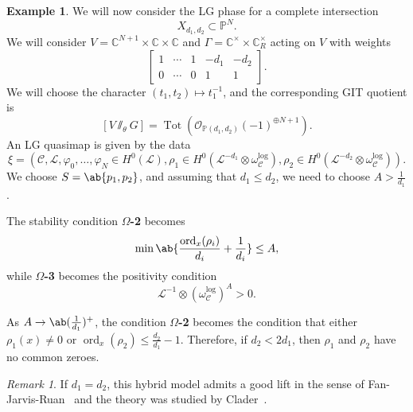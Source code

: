 \documentclass[10pt,oldfontcommands,oneside]{memoir}
\theoremstyle{definition}
\newtheorem{exm}[thm]{Example}
\theoremstyle{remark}
\newtheorem{rmk}[thm]{Remark}
\theoremstyle{plain}
\theoremstyle{definition}
\theoremstyle{remark}
\newcommand{\C}{\mathbb{C}}
\renewcommand{\P}{\mathbb{P}}
\newcommand{\mc}[1]{\mathcal{#1}}
\newcommand{\on}[1]{\operatorname{#1}}
\newcommand{\1}{\mathbf{1}}
\newcommand{\2}{\mathbf{2}}
\newcommand{\3}{\mathbf{3}}
\begin{document}
\begin{exm}
    We will now consider the LG phase for a complete intersection
    \[ X_{d_1, d_2} \subset \P^N. \]
    We will consider $V = \C^{N+1} \times \C \times \C$ and $\Gamma = \C^{\times} \times \C^{\times}_R$ acting on $V$ with weights
    \[ \begin{bmatrix}
        1 & \cdots & 1 & -d_1 & -d_2 \\
        0 & \cdots & 0 & 1 & 1
    \end{bmatrix}. \]
    We will choose the character $(t_1, t_2) \mapsto t_1^{-1}$, and the corresponding GIT quotient is 
    \[ [V \sslash_{\theta} G] = \on{Tot}(\mc{O}_{\P(d_1, d_2)}(-1)^{\oplus N+1}). \] 
    An LG quasimap is given by the data
    \[ \xi = (\mc{C}, \mc{L}, \varphi_0, \ldots, \varphi_N \in H^0(\mc{L}), \rho_1 \in H^0( \mc{L}^{-d_1} \otimes \omega_{\mc{C}}^{\log} ), \rho_2 \in H^0(\mc{L}^{-d_2} \otimes \omega_{\mc{C}}^{\log})). \]
    We choose $S = \ab\{p_1, p_2 \}$, and assuming that $d_1 \leq d_2$, we need to choose $A > \frac{1}{d_1}$.

    The stability condition \textbf{$\Omega$-2} becomes
    \[ \min \ab\{ \frac{\on{ord}_x(\rho_i)}{d_i} + \frac{1}{d_i}\} \leq A, \]
    while \textbf{$\Omega$-3} becomes the positivity condition
    \[ \mc{L}^{-1} \otimes (\omega_{\mc{C}}^{\log})^A > 0. \]

    As $A \to \ab(\frac{1}{d_1})^+$, the condition \textbf{$\Omega$-2} becomes the condition that either $\rho_1(x) \neq 0$ or $\on{ord}_x(\rho_2) \leq \frac{d_2}{d_1} - 1$. Therefore, if $d_2 < 2 d_1$, then $\rho_1$ and $\rho_2$ have no common zeroes.
\end{exm}

\begin{rmk}
    If $d_1 = d_2$, this hybrid model admits a good lift in the sense of Fan-Jarvis-Ruan~\cite{glsm} and the theory was studied by Clader~\cite{clader}.
\end{rmk}
\end{document}
